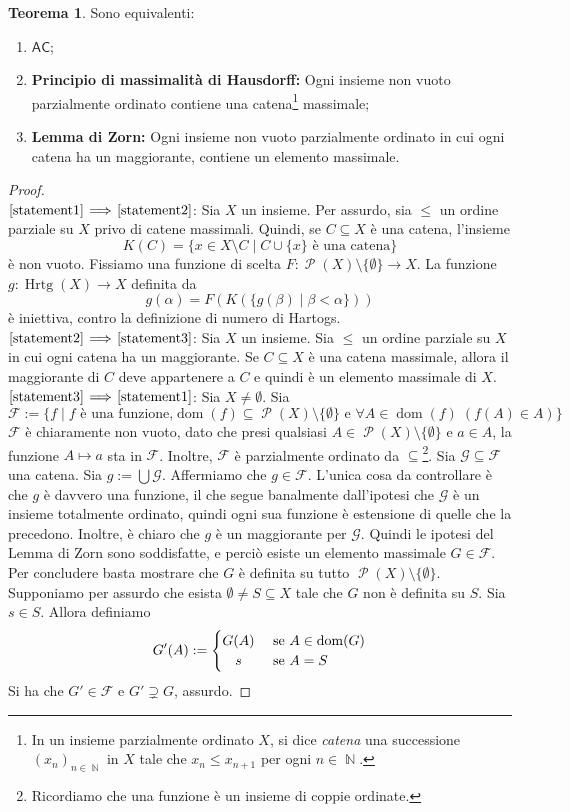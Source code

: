 \documentclass[12pt,a4paper]{report}
\theoremstyle{definition}
\newtheorem{teo}{Teorema}[section]  %
\theoremstyle{num.custom-title}
\DeclareMathOperator{\dom}{dom}
\DeclareMathOperator{\PP}{\mathcal{P}}
\DeclareMathOperator{\Hrtg}{\text{Hrtg}}
\DeclareMathOperator{\N}{\mathbb{N}}
\DeclareMathOperator{\sm}{\setminus}
\newcommand{\AC}{\ensuremath{\mathsf{AC}}\xspace}
\newcommand{\Implies}[2]{$\text{\ref{statement#1}}\!\implies\!\text{\ref{statement#2}}$}%
\newcommand{\punto}[1]{\item \label{statement#1}}
\newenvironment{equivalence}
    {\begin{enumerate}[label=(\arabic*),ref=(\arabic*)]
    }
    { 
	\end{enumerate}
    }
\begin{document}
\begin{teo} Sono equivalenti:
\begin{equivalence}
\punto{1} \AC;
\punto{2} \textbf{Principio di massimalità di Hausdorff:} Ogni insieme non vuoto parzialmente ordinato contiene una catena\footnote{In un insieme parzialmente ordinato $X$, si dice \emph{catena} una successione $(x_n)_{n \in \N}$ in $X$ tale che $x_n \leq x_{n+1}$ per ogni $n \in \N$.} massimale;
\punto{3} \textbf{Lemma di Zorn:} Ogni insieme non vuoto parzialmente ordinato in cui ogni catena ha un maggiorante, contiene un elemento massimale.
\end{equivalence}
\begin{proof}\ \\
\Implies{1}{2}: Sia $X$ un insieme. Per assurdo, sia $\leq$ un ordine parziale su $X$ privo di catene massimali. Quindi, se $C \subseteq X$ è una catena, l'insieme
\[
K(C) = \{x \in X \sm C \mid C \cup \{x\} \text{ è una catena}\}
\]
è non vuoto. Fissiamo una funzione di scelta $F: \PP(X) \sm \{\emptyset\} \to X$. La funzione $g: \Hrtg(X) \to X$ definita da 
\[
g(\alpha) = F(K(\{g(\beta) \mid \beta < \alpha\}))
\]
è iniettiva, contro la definizione di numero di Hartogs.\\
\Implies{2}{3}: Sia $X$ un insieme. Sia $\leq$ un ordine parziale su $X$ in cui ogni catena ha un maggiorante. Se $C \subseteq X$ è una catena massimale, allora il maggiorante di $C$ deve appartenere a $C$ e quindi è un elemento massimale di $X$.\\
\Implies{3}{1}: Sia $X \neq \emptyset$. Sia
\[
\mathcal{F}:=\{f \mid f \text{ è una funzione,} \dom(f) \subseteq \PP(X) \sm \{\emptyset\} \text{ e } \forall A \in \dom(f) \; (f(A) \in A)\}
\]
$\mathcal{F}$ è chiaramente non vuoto, dato che presi qualsiasi $A \in \PP(X) \sm \{\emptyset\}$ e $a \in A$, la funzione $A \mapsto a$ sta in $\mathcal{F}$. Inoltre, $\mathcal{F}$ è parzialmente ordinato da $\subseteq$\footnote{Ricordiamo che una funzione è un insieme di coppie ordinate.}. Sia $\mathcal{G} \subseteq \mathcal{F}$ una catena. Sia $g:=\bigcup \mathcal{G}$. Affermiamo che $g \in \mathcal{F}$. L'unica cosa da controllare è che $g$ è davvero una funzione, il che segue banalmente dall'ipotesi che $\mathcal{G}$ è un insieme totalmente ordinato, quindi ogni sua funzione è estensione di quelle che la precedono. Inoltre, è chiaro che $g$ è un maggiorante per $\mathcal{G}$. Quindi le ipotesi del Lemma di Zorn sono soddisfatte, e perciò esiste un elemento massimale $G \in \mathcal{F}$. Per concludere basta mostrare che $G$ è definita su tutto $\PP(X) \sm \{\emptyset\}$. Supponiamo per assurdo che esista $\emptyset \neq S \subseteq X$ tale che $G$ non è definita su $S$. Sia $s \in S$. Allora definiamo 
\[
G'(A):= 
  \begin{cases} 
      \hfill G(A)	\hfill & \text{ se $A \in \dom(G)$} \\
      \hfill  s		\hfill & \text{ se $A=S$} \\
  \end{cases}
\]
Si ha che $G' \in \mathcal{F}$ e $G' \supsetneq G$, assurdo.
\end{proof}
\end{teo}
\end{document}
